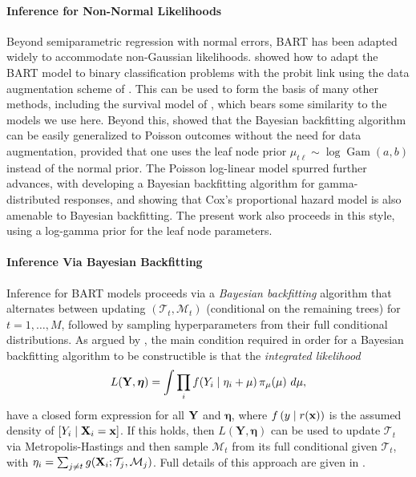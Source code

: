 \documentclass[12pt]{article}
\newcommand{\Gam}{\operatorname{Gam}}
\newcommand{\sM}{\mathcal M}
\newcommand{\Tree}{\mathcal T}
\newcommand{\bfX}{{\bf X}}
\newcommand{\bfY}{{\bf Y}}
\newcommand{\bfx}{{\bf x}}
\begin{document}
\paragraph{Inference for Non-Normal Likelihoods}
Beyond semiparametric regression with normal errors, BART has been adapted widely to accommodate non-Gaussian likelihoods. \citet{chipman2010bart} showed how to adapt the BART model to binary classification problems with the probit link using the data augmentation scheme of \citet{albert1993bayesian}. This can be used to form the basis of many other methods, including the survival model of \citet{sparapani2016nonparametric}, which bears some similarity to the models we use here. Beyond this, \citet{murray2020log} showed that the Bayesian backfitting algorithm can be easily generalized to Poisson outcomes without the need for data augmentation, provided that one uses the leaf node prior $\mu_{t\ell} \sim \log \Gam(a, b)$ instead of the normal prior. The Poisson log-linear model spurred further advances, with \citet{linero2018shared} developing a Bayesian backfitting algorithm for gamma-distributed responses, and \citet{linero2021bayesian} showing that Cox's proportional hazard model is also amenable to Bayesian backfitting. The present work also proceeds in this style, using a log-gamma prior for the leaf node parameters.

\paragraph{Inference Via Bayesian Backfitting}
Inference for BART models proceeds via a \emph{Bayesian backfitting} algorithm that alternates between updating $(\Tree_t, \sM_t)$ (conditional on the remaining trees) for $t = 1,\ldots, M$, followed by sampling hyperparameters from their full conditional distributions. As argued by \citet{linero2024generalized}, the main condition required in order for a Bayesian backfitting algorithm to be constructible is that the \emph{integrated likelihood}
\begin{align*}
    L(\bfY, \bm{\eta}) = \int \prod_i f(Y_i \mid \eta_i + \mu) \, \pi_\mu(\mu) \ d\mu,
\end{align*}
have a closed form expression for all $\bfY$ and $\bm{\eta}$, where $f\left(y \mid r(\bfx)\right)$ is the assumed density of $[Y_i \mid \bfX_i = \bfx]$. If this holds, then $L(\mathbf Y, \bm\eta)$ can be used to update $\Tree_t$ via Metropolis-Hastings and then sample $\sM_t$ from its full conditional given $\Tree_t$, with $\eta_i = \sum_{j \ne t} g(\bfX_i; \Tree_j, \sM_j)$. Full details of this approach are given in \citet{linero2024generalized}.
\end{document}
